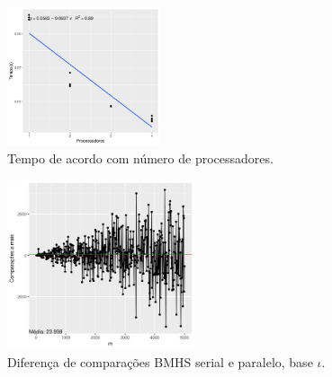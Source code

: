 \documentclass[11pt]{article}
\begin{document}
\begin{figure}
\caption{Tempo de acordo com número de processadores.}\label{fig:pxtime}
\includegraphics[width=4.5cm]{pxtime}
\end{figure} 
\begin{figure}
\end{figure}
\begin{figure}
\caption{Diferença de comparações BMHS serial e paralelo, base $\iota$.}\label{fig:mxcompparalelo}
\includegraphics[width=5.5cm]{mxcompparalelo}
\end{figure}
\end{document}

